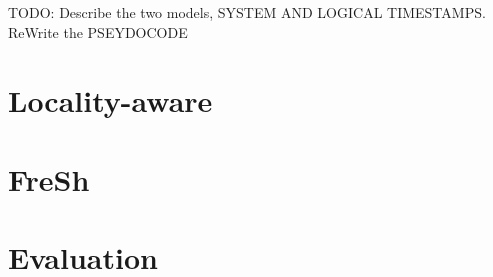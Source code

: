 \documentclass[a4paper,11pt,twoside,openany]{book}
\newcommand{\PS}{\mbox{$\mathit{PS}$}}
\newcommand{\RS}{\mbox{$\mathit{RS}$}}
\begin{document}
TODO: Describe the two models, SYSTEM AND LOGICAL TIMESTAMPS. ReWrite the PSEYDOCODE


\chapter{Locality-aware}
\label{chapter:Locality-aware}

\chapter{FreSh}
\label{chapter:FreSh}

\chapter{Evaluation}
\label{chapter:Evaluation}






\cleardoublepage
{}

\end{document}
